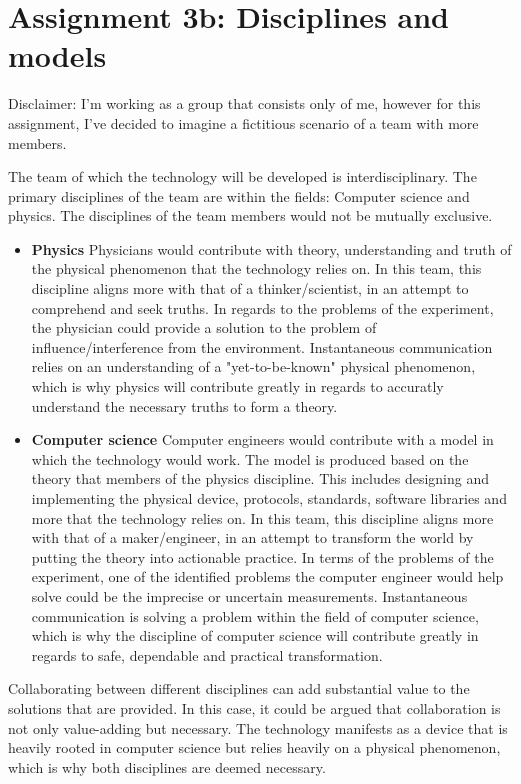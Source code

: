 \section*{Assignment 3b: Disciplines and models} 
Disclaimer: I'm working as a group that consists only of me, however for this assignment, I've decided to imagine a fictitious scenario of a team with more members.

The team of which the technology will be developed is interdisciplinary.
The primary disciplines of the team are within the fields: Computer science and physics. The disciplines of the team members would not be mutually exclusive.

\begin{itemize}
    \item \textbf{Physics}
    Physicians would contribute with theory, understanding and truth of the physical phenomenon that the technology relies on. 
    In this team, this discipline aligns more with that of a thinker/scientist, in an attempt to comprehend and seek truths.
    In regards to the problems of the experiment, the physician could provide a solution to the problem of influence/interference from the environment.
    Instantaneous communication relies on an understanding of a "yet-to-be-known" physical phenomenon, which is why physics will contribute greatly in regards to accuratly understand the necessary truths to form a theory.

    \item \textbf{Computer science}
    Computer engineers would contribute with a model in which the technology would work. The model is produced based on the theory that members of the physics discipline.
    This includes designing and implementing the physical device, protocols, standards, software libraries and more that the technology relies on.
    In this team, this discipline aligns more with that of a maker/engineer, in an attempt to transform the world by putting the theory into actionable practice.
    In terms of the problems of the experiment, one of the identified problems the computer engineer would help solve could be the imprecise or uncertain measurements.
    Instantaneous communication is solving a problem within the field of computer science, which is why the discipline of computer science will contribute greatly in regards to safe, dependable and practical transformation.
\end{itemize}

Collaborating between different disciplines can add substantial value to the solutions that are provided. 
In this case, it could be argued that collaboration is not only value-adding but necessary.
The technology manifests as a device that is heavily rooted in computer science but relies heavily on a physical phenomenon, which is why both disciplines are deemed necessary.

